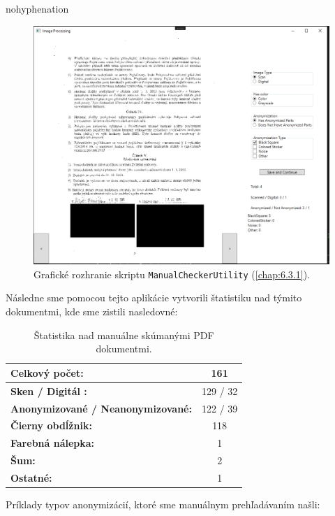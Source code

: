\begin{hyphenrules}{nohyphenation}
\begin{figure}[H]
\includegraphics[width=\linewidth]{img/image_proc.png}
\caption{Grafické rozhranie skriptu \texttt{ManualCheckerUtility} (\ref{chap:6.3.1}).}
\label{fig:3.2}
\end{figure}

Následne sme pomocou tejto aplikácie vytvorili štatistiku nad týmito dokumentmi, kde sme zistili nasledovné:

\begin{table}[H]
\caption{Štatistika nad manuálne skúmanými PDF dokumentmi.}
\label{table:3.1}
\begin{tabular}{|l|c|}
\hline
\textbf{Celkový počet:} & 161 \\ \hline
\textbf{Sken / Digitál :} & 129 / 32 \\ \hline
\textbf{Anonymizované / Neanonymizované:} & 122 / 39 \\ \hline
\textbf{Čierny obdĺžnik:} & 118 \\ \hline
\textbf{Farebná nálepka:} & 1 \\ \hline
\textbf{Šum:} & 2 \\ \hline
\textbf{Ostatné:} & 1 \\ \hline
\end{tabular}
\end{table}
Príklady typov anonymizácií, ktoré sme manuálnym prehľadávaním našli:


\end{hyphenrules}

